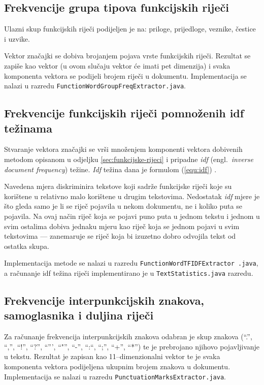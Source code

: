 \documentclass{article}
\newcommand{\engl}[1]{(engl.~\emph{#1})}
\begin{document}
\subsection{Frekvencije grupa tipova funkcijskih riječi}
\label{sec:funkcijske-rijeci-grupe}
Ulazni skup funkcijskih riječi podijeljen je na: priloge, prijedloge, veznike,
čestice i uzvike.

Vektor značajki se dobiva brojanjem pojava vrste funkcijskih riječi. Rezultat
se zapiše kao vektor (u ovom slučaju vektor će imati pet dimenzija) i svaka
komponenta vektora se podijeli brojem riječi u dokumentu. Implementacija se
nalazi u razredu \texttt{FunctionWordGroupFreqExtractor.java}.

\subsection{Frekvencije funkcijskih riječi pomnoženih idf težinama}
\label{sec:funkcijske-rijeci-idf}
Stvaranje vektora značajki se vrši množenjem komponenti vektora dobivenih metodom
opisanom u odjeljku \ref{sec:funkcijske-rijeci} i pripadne \emph{idf} \engl{inverse
document frequency} težine. \emph{Idf} težina dana je formulom (\ref{equ:idf})
\citep{diederich2003authorship}.

Navedena mjera diskriminira tekstove koji sadrže funkcijske riječi koje su
korištene u relativno malo korištene u drugim tekstovima. Nedostatak \emph{idf}
mjere je što gleda samo je li se riječ pojavila u nekom dokumentu, ne i koliko
puta se pojavila. Na ovaj način riječ koja se pojavi puno puta u jednom
tekstu i jednom u svim ostalima dobiva jednaku mjeru kao riječ koja se jednom
pojavi u svim tekstovima --- zanemaruje se riječ koja bi izuzetno dobro
odvojila tekst od ostatka skupa.

Implementacija metode se nalazi u razredu
\texttt{FunctionWordTFIDFExtractor .java}, a računanje idf težina riječi
implementirano je u \texttt{TextStatistics.java} razredu.


\subsection{Frekvencije interpunkcijskih znakova, samoglasnika i duljina riječi}
\label{sec:znacajke-manje}
Za računanje frekvencija interpunkcijskih znakova odabran je skup znakova (``.'',
``,'', ``!'', ``?'', ``''', ``"'', ``-'', ``:``, ``;'', ``+'', ``*'') te je
prebrojano njihovo pojavljivanje u tekstu. Rezultat je zapisan kao
11--dimenzionalni vektor te je svaka komponenta vektora podijeljena ukupnim
brojem znakova u dokumentu. Implementacija se nalazi u razredu
\texttt{PunctuationMarksExtractor.java}.
\end{document}
